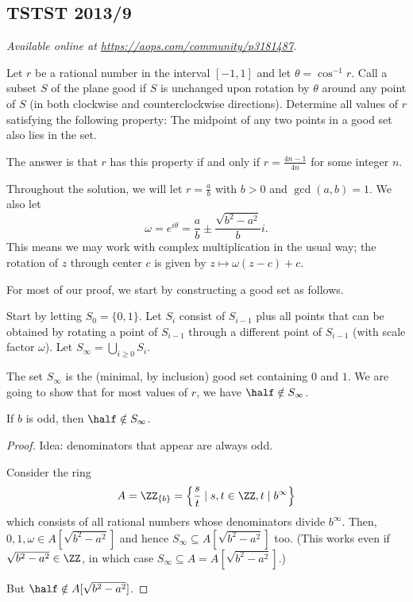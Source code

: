 \documentclass[11pt]{scrartcl}
\begin{document}
\subsection{TSTST 2013/9}
\textsl{Available online at \url{https://aops.com/community/p3181487}.}
\begin{mdframed}[style=mdpurplebox,frametitle={Problem statement}]
Let $r$ be a rational number in the interval $[-1,1]$
and let $\theta = \cos^{-1} r$.
Call a subset $S$ of the plane good if $S$ is unchanged
upon rotation by $\theta$ around any point of $S$
(in both clockwise and counterclockwise directions).
Determine all values of $r$ satisfying the following property:
The midpoint of any two points in a good set also lies in the set.
\end{mdframed}
The answer is that $r$ has this property
if and only if $r = \frac{4n-1}{4n}$ for some integer $n$.

Throughout the solution, we will let $r = \frac ab$ with $b > 0$ and
$\gcd(a,b) = 1$. We also let
\[ \omega = e^{i\theta} = \frac ab \pm \frac{\sqrt{b^2-a^2}}{b} i. \]
This means we may work with complex multiplication in the usual way;
the rotation of $z$ through center $c$ is given by $z \mapsto \omega(z-c)+c$.

For most of our proof, we start by constructing a good set as follows.
\begin{itemize}
  \ii Start by letting $S_0 = \{0, 1\}$.
  \ii Let $S_i$ consist of $S_{i-1}$ plus
  all points that can be obtained by rotating a point of $S_{i-1}$
  through a different point of $S_{i-1}$ (with scale factor $\omega$).
  \ii Let $S_\infty = \bigcup_{i \ge 0} S_i$.
\end{itemize}
The set $S_\infty$ is the (minimal, by inclusion) good set containing
$0$ and $1$.
We are going to show that for most values of $r$,
we have $\half \notin S_\infty$.

\begin{claim*}
  If $b$ is odd, then $\half \notin S_\infty$.
\end{claim*}
\begin{proof}
  Idea: denominators that appear are always odd.

  Consider the ring
  \[ A = \ZZ_{\{b\}} = \left\{ \frac{s}{t} \mid s,t \in \ZZ, t \mid b^\infty \right\} \]
  which consists of all rational numbers
  whose denominators divide $b^\infty$.
  Then, $0, 1, \omega \in A[\sqrt{b^2-a^2}]$
  and hence $S_\infty \subseteq A[\sqrt{b^2-a^2}]$ too.
  (This works even if $\sqrt{b^2-a^2} \in \ZZ$,
  in which case $S_\infty \subseteq A = A[\sqrt{b^2-a^2}]$.)

  But $\half \notin A[\sqrt{b^2-a^2}]$.
\end{proof}
\end{document}
